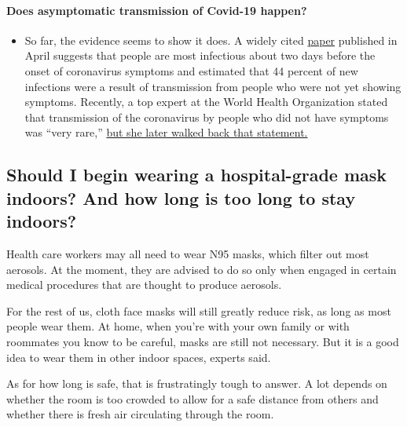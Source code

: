 \begin{itemize}
{  \paragraph{Does asymptomatic transmission of Covid-19
  happen?}\label{does-asymptomatic-transmission-of-covid-19-happen}}

  \begin{itemize}
  \tightlist
  \item
    So far, the evidence seems to show it does. A widely cited
    \href{https://www.nature.com/articles/s41591-020-0869-5}{paper}
    published in April suggests that people are most infectious about
    two days before the onset of coronavirus symptoms and estimated that
    44 percent of new infections were a result of transmission from
    people who were not yet showing symptoms. Recently, a top expert at
    the World Health Organization stated that transmission of the
    coronavirus by people who did not have symptoms was ``very rare,''
    \href{https://www.nytimes3xbfgragh.onion/2020/06/09/world/coronavirus-updates.html?action=click\&pgtype=Article\&state=default\&region=MAIN_CONTENT_3\&context=storylines_faq\#link-1f302e21}{but
    she later walked back that statement.}
  \end{itemize}
\end{itemize}

\hypertarget{should-i-begin-wearing-a-hospital-grade-mask-indoors-and-how-long-is-too-long-to-stay-indoors}{%
\subsection{Should I begin wearing a hospital-grade mask indoors? And
how long is too long to stay
indoors?}\label{should-i-begin-wearing-a-hospital-grade-mask-indoors-and-how-long-is-too-long-to-stay-indoors}}

Health care workers may all need to wear N95 masks, which filter out
most aerosols. At the moment, they are advised to do so only when
engaged in certain medical procedures that are thought to produce
aerosols.

For the rest of us, cloth face masks will still greatly reduce risk, as
long as most people wear them. At home, when you're with your own family
or with roommates you know to be careful, masks are still not necessary.
But it is a good idea to wear them in other indoor spaces, experts said.

As for how long is safe, that is frustratingly tough to answer. A lot
depends on whether the room is too crowded to allow for a safe distance
from others and whether there is fresh air circulating through the room.

